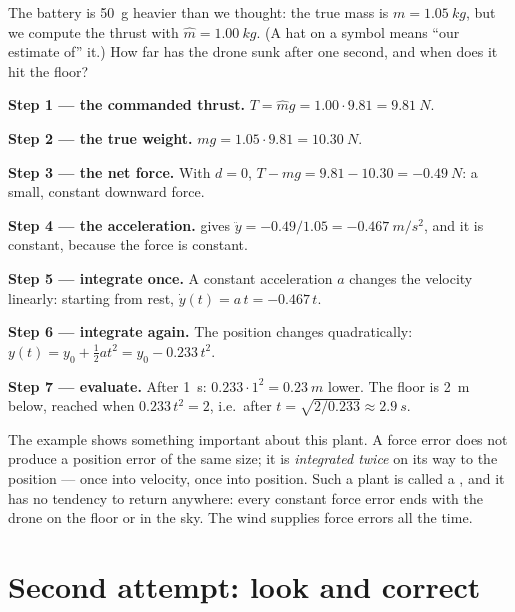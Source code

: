 \begin{example}
\label{ex:meet-open}
The battery is \SI{50}{g} heavier than we thought: the true mass is $m = \SI{1.05}{kg}$, but we compute the thrust with $\hat m = \SI{1.00}{kg}$. (A hat on a symbol means \enquote{our estimate of} it.) How far has the drone sunk after one second, and when does it hit the floor?

\textbf{Step 1 — the commanded thrust.} $T = \hat m g = 1.00 \cdot 9.81 = \SI{9.81}{N}$.

\textbf{Step 2 — the true weight.} $mg = 1.05 \cdot 9.81 = \SI{10.30}{N}$.

\textbf{Step 3 — the net force.} With $d = 0$, $T - mg = 9.81 - 10.30 = \SI{-0.49}{N}$: a small, constant downward force.

\textbf{Step 4 — the acceleration.}  gives $\ddot y = -0.49/1.05 = \SI{-0.467}{m/s^2}$, and it is constant, because the force is constant.

\textbf{Step 5 — integrate once.} A constant acceleration $a$ changes the velocity linearly: starting from rest, $\dot y(t) = a\,t = -0.467\,t$.

\textbf{Step 6 — integrate again.} The position changes quadratically: $y(t) = y_0 + \tfrac12 a t^2 = y_0 - 0.233\,t^2$.

\textbf{Step 7 — evaluate.} After \SI{1}{s}: $0.233 \cdot 1^2 = \SI{0.23}{m}$ lower. The floor is \SI{2}{m} below, reached when $0.233\,t^2 = 2$, i.e.\ after $t = \sqrt{2/0.233} \approx \SI{2.9}{s}$.
\end{example}

The example shows something important about this plant. A force error does not produce a position error of the same size; it is \emph{integrated twice} on its way to the position — once into velocity, once into position. Such a plant is called a , and it has no tendency to return anywhere: every constant force error ends with the drone on the floor or in the sky. The wind supplies force errors all the time.

\section{Second attempt: look and correct}

